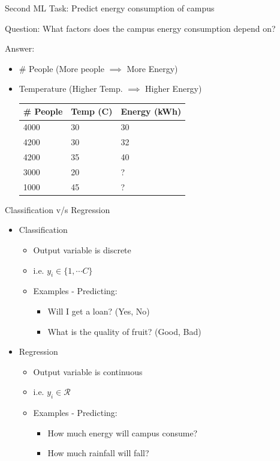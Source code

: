 \documentclass[usenames,dvipsnames]{beamer}
\begin{document}
\begin{frame}{Second ML Task: Predict energy consumption of campus}

Question: What factors does the campus energy consumption depend on?

Answer:\begin{itemize}
	\item \pause \# People (More people $\implies$ More Energy)
	\item \pause Temperature (Higher Temp. $\implies$ Higher Energy)

\pause \begin{table}[]
	\begin{tabular}{|l|l||l|}
		\hline 
		
		\textbf{\# People} & \textbf{Temp (C)} &  \textbf{Energy (kWh)} \\ \hline 
		
		4000 & 30 & 30 \\
		4200 & 30 & 32 \\
		4200 & 35 & 40 \\ \hline
		3000 & 20& ? \\
		1000 & 45 & ? \\ \hline          
	\end{tabular}
\end{table}	
\end{itemize}

\end{frame}





\begin{frame}{Classification v/s Regression}
\begin{itemize}
	\item Classification
	\begin{itemize}
		\item \pause Output variable is discrete
		\item \pause i.e.  $y_i\in \{1, \cdots C\}$ 
		\item \pause Examples - Predicting: 
		\begin{itemize}
			\item \pause Will I get a loan? (Yes, No)
			\item \pause What is the quality of fruit? (Good, Bad)
		\end{itemize}
	\end{itemize}
	\item \pause Regression
	\begin{itemize}
		\item \pause Output variable is continuous
		\item \pause i.e.  $y_i\in \mathcal{R}$ 
		\item \pause Examples - Predicting: 
		\begin{itemize}
			\item \pause How much energy will campus consume? 
			\item \pause How much rainfall will fall?
		\end{itemize}
	\end{itemize}
\end{itemize}

\end{frame}
\end{document}
